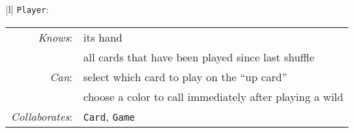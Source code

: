 \label{unoCRC2}
\begin{center}
\begin{tabular}{|l|}
\hline
\texttt{Player}:\\
\hline
\begin{tabular}{rl}
\textit{Knows}: & its hand \\
& all cards that have been played since last shuffle \\
\textit{Can}: & select which card to play on the ``up card'' \\
& choose a color to call immediately after playing a wild \\
\hline
\textit{Collaborates}: & \texttt{Card}, \texttt{Game} \\
\end{tabular}\\
\hline
\end{tabular}
\end{center}

\normalsize
